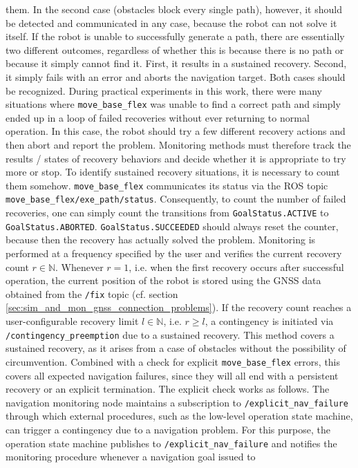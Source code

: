 \documentclass[english, master, utf8]{base/thesis_KBS}
\newcommand{\code}[1]{\colorbox{light-gray}{\texttt{#1}}}
\begin{document}
them. In the second case (obstacles block every single path), however, it should be detected and communicated in any case, because the robot can not solve it itself. If the robot is unable to successfully generate a
path, there are essentially two different outcomes, regardless of whether this is because there is no path or because it simply cannot find it. First, it results in a sustained
recovery. Second, it simply fails with an error and aborts the navigation target. Both cases should be recognized. During practical experiments in this work, there were many
situations where \code{move\_base\_flex} was unable to find a correct path and simply ended up in a loop of failed recoveries without ever returning to normal operation. In this
case, the robot should try a few different recovery actions and then abort and report the problem. Monitoring methods must therefore track the results / states of recovery
behaviors and decide whether it is appropriate to try more or stop. To identify sustained recovery situations, it is necessary to count them somehow. \code{move\_base\_flex}
communicates its status via the ROS topic \code{move\_base\_flex/exe\_path/status}. Consequently, to count the number of failed recoveries, one can simply count the transitions
from \code{GoalStatus.ACTIVE} to \code{GoalStatus.ABORTED}. \code{GoalStatus.SUCCEEDED} should always reset the counter, because then the recovery has actually solved the problem.
Monitoring is performed at a frequency specified by the user and verifies the current recovery count $r \in \mathbb{N}$. Whenever $r = 1$, i.e. when the first recovery occurs after successful
operation, the current position of the robot is stored using the GNSS data obtained from the \code{/fix} topic (cf. section \ref{sec:sim_and_mon_gnss_connection_problems}). If the
recovery count reaches a user-configurable recovery limit $l \in \mathbb{N}$, i.e. $r \geq l$, a contingency is initiated via \code{/contingency\_preemption} due to a sustained recovery. This method covers a sustained recovery, as it
arises from a case of obstacles without the possibility of circumvention. Combined with a check for explicit \code{move\_base\_flex} errors, this covers all expected navigation failures, since
they will all end with a persistent recovery or an explicit termination. The explicit check works as follows. The navigation monitoring node maintains a subscription to
\code{/explicit\_nav\_failure} through which external procedures, such as the low-level operation state machine, can trigger a contingency due to a navigation problem. For this
purpose, the operation state machine publishes to \code{/explicit\_nav\_failure} and notifies the monitoring procedure whenever a navigation goal issued to
\end{document}
